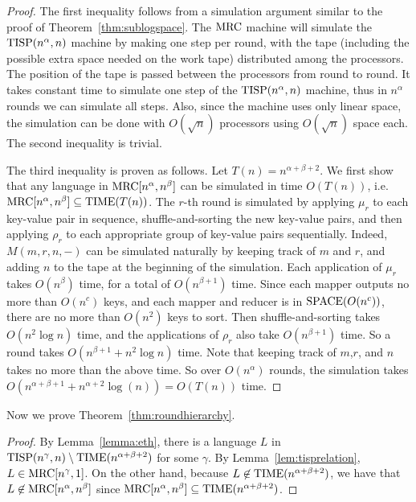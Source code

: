 \documentclass[11pt]{article}
\theoremstyle{definition}
\theoremstyle{remark}
\newcommand{\mrc}{\textup{MRC}}
\newcommand{\SPACE}{\textup{SPACE}}
\newcommand{\TIME}{\textup{TIME}}
\newcommand{\TISP}{\textup{TISP}}
\begin{document}
\begin{proof} The first inequality follows from a simulation argument similar
to the proof of Theorem~\ref{thm:sublogspace}. The $\mrc$ machine will simulate
the $\TISP(n^\alpha,n)$ machine by making one step per round, with the tape
(including the possible extra space needed on the work tape) distributed among
the processors.  The position of the tape is passed between the processors from
round to round.  It takes constant time to simulate one step of the
$\TISP(n^\alpha,n)$ machine, thus in $n^\alpha$ rounds we can simulate all
steps.  Also, since the machine uses only linear space, the simulation can be
done with $O(\sqrt{n})$ processors using $O(\sqrt{n})$ space each.  The second
inequality is trivial.

The third inequality is proven as follows. Let $T(n) = n^{\alpha+\beta+2}$.
We first show that any language in $\mrc[n^\alpha,n^\beta]$ can be simulated in
time $O(T(n))$, i.e. $\mrc[n^\alpha,n^\beta] \subseteq \TIME(T(n))$. The $r$-th
round is simulated by applying $\mu_r$ to each key-value pair in sequence,
shuffle-and-sorting the new key-value pairs, and then applying $\rho_r$ to each
appropriate group of key-value pairs sequentially. Indeed, $M(m,r,n,-)$ can be
simulated naturally by keeping track of $m$ and $r$, and adding $n$ to the tape
at the beginning of the simulation. Each application of $\mu_r$ takes
$O(n^\beta)$ time, for a total of $O(n^{\beta+1})$ time. Since each mapper
outputs no more than $O(n^c)$ keys, and each mapper and reducer is in
$\SPACE(O(n^c))$, there are no more than $O(n^2)$ keys to sort. Then
shuffle-and-sorting takes $O(n^2 \log n)$ time, and the applications of
$\rho_r$ also take $O(n^{\beta+1})$ time. So a round takes $O(n^{\beta+1} +
n^2 \log n)$ time. Note that keeping track of $m$,$r$, and $n$ takes no more
than the above time. So over $O(n^\alpha)$ rounds, the simulation takes
$O(n^{\alpha+\beta+1}+n^{\alpha+2} \log(n))=O(T(n))$ time. \end{proof}

Now we prove Theorem~\ref{thm:roundhierarchy}.

\begin{proof}
By Lemma~\ref{lemma:eth}, there is a language $L$ in $\TISP(n^\gamma,
n)\setminus \TIME(n^{\alpha+\beta+2})$ for some $\gamma$. By
Lemma~\ref{lem:tisprelation}, $L\in \mrc[n^\gamma, 1]$. On the other hand,
because $L\not\in  \TIME(n^{\alpha+\beta+2})$, we have that $L\not\in
\mrc[n^\alpha, n^\beta]$ since $\mrc[n^\alpha, n^\beta]\subseteq
\TIME(n^{\alpha+\beta+2})$.
\end{proof}
\end{document}
